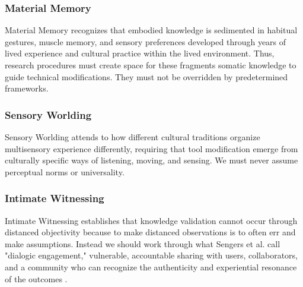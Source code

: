 \subsubsection{Material Memory}
\noindent Material Memory recognizes that embodied knowledge is sedimented in habitual gestures, muscle memory, and sensory preferences developed through years of lived experience and cultural practice within the lived environment. Thus, research procedures must create space for these fragments somatic knowledge to guide technical modifications. They must not be overridden by predetermined frameworks. 

\subsubsection{Sensory Worlding}
\noindent Sensory Worlding attends to how different cultural traditions organize multisensory experience differently, requiring that tool modification emerge from culturally specific ways of listening, moving, and sensing. We must never assume perceptual norms or universality.   

\subsubsection{Intimate Witnessing}
\noindent  Intimate Witnessing establishes that knowledge validation cannot occur through distanced objectivity because to make distanced observations is to often err and make assumptions. Instead we should work through what Sengers et al. call "dialogic engagement," vulnerable, accountable sharing with users, collaborators, and a community who can recognize the authenticity and experiential resonance of the outcomes \parencites[56]{Sengers_2004}.
